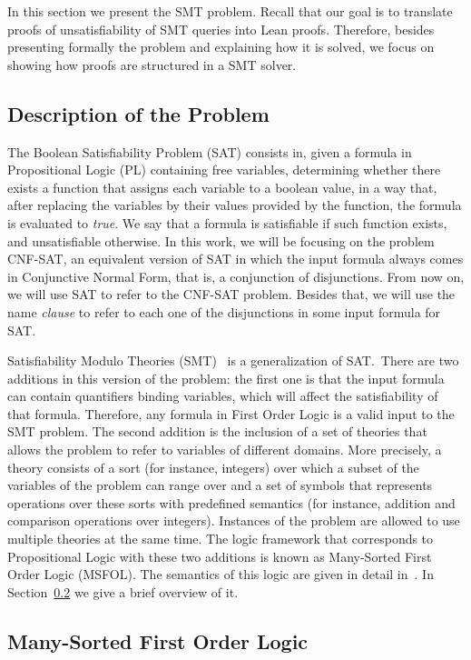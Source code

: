 
In this section we present the SMT problem. Recall that our goal is to translate proofs of unsatisfiability of SMT queries into Lean proofs. Therefore, besides presenting formally the problem and explaining how it is solved, we focus on showing how proofs are structured in a SMT solver.

\subsection{Description of the Problem}

The Boolean Satisfiability Problem (SAT) consists in, given a formula in Propositional Logic (PL) containing free variables, determining whether there exists a function that assigns each variable to a boolean value, in a way that, after replacing the variables by their values provided by the function, the formula is evaluated to \textit{true}. We say that a formula is satisfiable if such function exists, and unsatisfiable otherwise. In this work, we will be focusing on the problem CNF-SAT, an equivalent version of SAT in which the input formula always comes in Conjunctive Normal Form, that is, a conjunction of disjunctions. From now on, we will use SAT to refer to the CNF-SAT problem. Besides that, we will use the name \textit{clause} to refer to each one of the disjunctions in some input formula for SAT.

Satisfiability Modulo Theories (SMT)~\cite{smt} is a generalization of SAT.\ There are two additions in this version of the problem: the first one is that the input formula can contain quantifiers binding variables, which will affect the satisfiability of that formula. Therefore, any formula in First Order Logic is a valid input to the SMT problem. The second addition is the inclusion of a set of theories that allows the problem to refer to variables of different domains. More precisely, a theory consists of a sort (for instance, integers) over which a subset of the variables of the problem can range over and a set of symbols that represents operations over these sorts with predefined semantics (for instance, addition and comparison operations over integers). Instances of the problem are allowed to use multiple theories at the same time. The logic framework that corresponds to Propositional Logic with these two additions is known as Many-Sorted First Order Logic (MSFOL). The semantics of this logic are given in detail in~\cite{many_sorted}. In Section~\ref{sec:msfolHere} we give a brief overview of it.

\subsection{Many-Sorted First Order Logic}\label{sec:msfolHere}

